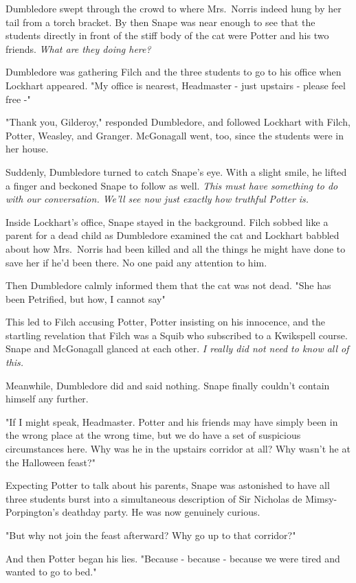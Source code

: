 Dumbledore swept through the crowd to where Mrs.~Norris indeed hung by her tail from a torch bracket. By then Snape was near enough to see that the students directly in front of the stiff body of the cat were Potter and his two friends. \emph{What are they doing here?}

Dumbledore was gathering Filch and the three students to go to his office when Lockhart appeared. "My office is nearest, Headmaster - just upstairs - please feel free -"

"Thank you, Gilderoy," responded Dumbledore, and followed Lockhart with Filch, Potter, Weasley, and Granger. McGonagall went, too, since the students were in her house.

Suddenly, Dumbledore turned to catch Snape's eye. With a slight smile, he lifted a finger and beckoned Snape to follow as well. \emph{This must have something to do with our conversation. We'll see now just exactly how truthful Potter is.}

Inside Lockhart's office, Snape stayed in the background. Filch sobbed like a parent for a dead child as Dumbledore examined the cat and Lockhart babbled about how Mrs.~Norris had been killed and all the things he might have done to save her if he'd been there. No one paid any attention to him.

Then Dumbledore calmly informed them that the cat was not dead. "She has been Petrified, but how, I cannot say{\el}"

This led to Filch accusing Potter, Potter insisting on his innocence, and the startling revelation that Filch was a Squib who subscribed to a Kwikspell course. Snape and McGonagall glanced at each other. \emph{I really did not need to know all of this.}

Meanwhile, Dumbledore did and said nothing. Snape finally couldn't contain himself any further.

"If I might speak, Headmaster. Potter and his friends may have simply been in the wrong place at the wrong time, but we do have a set of suspicious circumstances here. Why was he in the upstairs corridor at all? Why wasn't he at the Halloween feast?"

Expecting Potter to talk about his parents, Snape was astonished to have all three students burst into a simultaneous description of Sir Nicholas de Mimsy-Porpington's deathday party. He was now genuinely curious.

"But why not join the feast afterward? Why go up to that corridor?"

And then Potter began his lies. "Because - because - because we were tired and wanted to go to bed."

